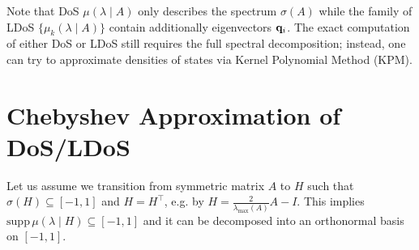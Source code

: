 \documentclass{mynotes}
\begin{document}
Note that DoS \( \mu ( \lambda \mid A ) \) only describes the spectrum \( \sigma ( A ) \) while the family of LDoS \( \{ \mu_k (\lambda \mid A ) \} \) contain additionally eigenvectors \( \mathbf{q}_i \). The exact computation of either DoS or LDoS still requires the full spectral decomposition; instead, one can try to approximate densities of states via Kernel Polynomial Method (KPM).%

\section{ Chebyshev Approximation of DoS/LDoS }

Let us assume we transition from symmetric matrix \( A \) to  \( H \) such that \( \sigma(H) \subseteq [-1, 1 ]\) and \( H = H^\top \), e.g. by \( H = \frac{2}{ \lambda_{\max{}} ( A ) } A - I \). This implies \( \mathrm{supp}\, \mu( \lambda \mid H ) \subseteq [-1, 1]\) and it can be decomposed into an orthonormal basis on \( [-1, 1]\). 
\end{document}
